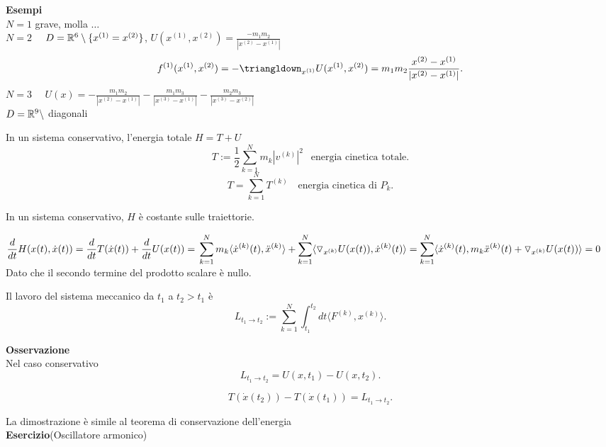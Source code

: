 \documentclass{article}
\begin{document}
\newpage
\textbf{Esempi}\\
$N = 1$ grave, molla $\ldots$\\
$N = 2$ \ \  $D = \mathbb{R}^6\setminus\{x^{(1)}=x^{(2)}\}$,  $U(x^{(1)},x^{(2)}) = \frac{-m_1m_2}{|x^{(2)} -x^{(1)}|}$\\
\[
	f^{(1)}(x^{(1)}, x^{(2)}) = -\triangldown_{x^{(1)}}U(x^{(1)}, x^{(2)}) = m_1m_2\frac{x^{(2)} - x^{(1)}}{|x^{(2)} - x^{(1)}|}
.\] 
$N = 3$ \ \  $U(x) = -\frac{m_1m_2}{|x^{(2)} - x^{(1)}|} -\frac{m_1m_3}{|x^{(3)} - x^{(1)}|} - \frac{m_2m_3}{|x^{(3)} - x^{(2)}|}$\\
$D = \mathbb{R}^9\setminus $ diagonali\\
\begin{defi}
	In un sistema conservativo, l'energia totale $H = T + U$
	 \[
		 T := \frac 12 \sum^N_{k=1} m_k |v^{(k)}|^2 \ \ \text{ energia cinetica totale}
	.\] 
	\[
		T = \sum^N_{k=1} T^{(k)} \ \ \ \text{ energia cinetica di } P_k
	.\] 
\end{defi}
\begin{teo}
	In un sistema conservativo, $H$ è costante sulle traiettorie.
\end{teo}
\begin{dimo}
	$\displaystyle\frac{d }{d t}H(x(t),\dot x(t)) = \frac{d }{d t} T(\dot x(t)) + \frac{d }{d t}U(x(t))= \\ \sum^N_{k=1}m_k \langle \dot x^{(k)}(t), \ddot x^{(k)} \rangle  + \sum^N_{k=1} \langle \triangledown_{x^{(k)}}U(x(t)), \dot x^{(k)}(t) \rangle \\
	= \sum^N_{k=1} \langle \dot x ^{(k)}(t)	, m_k\ddot x^{(k)}(t) + \triangledown _{x^{(k)}}U(x(t))  \rangle  = 0$ \\ 
	Dato che il secondo termine del prodotto scalare è nullo.
\end{dimo}
\begin{defi}[Lavoro]
	Il lavoro del sistema meccanico da $t_1$ a $t_2> t_1$ è
	\[
		L_{t_1 \rightarrow t_2} := \sum^N_{k=1} \int_{t_1}^{t_2}dt \langle F^{(k)}, x^{(k)} \rangle 
	.\] 
\end{defi}
\textbf{Osservazione}\\
Nel caso conservativo
\[
	L_{t_1 \rightarrow t_2}  = U(x,t_1) - U(x,t_2)
.\] 
\begin{teo}
	\[
		T(\dot x(t_2)) - T(\dot x(t_1)) = L_{t_1 \rightarrow t_2}
	.\] 
\end{teo}
La dimostrazione è simile al teorema di conservazione dell'energia\\
\textbf{Esercizio}(Oscillatore armonico)\\
\end{document}
